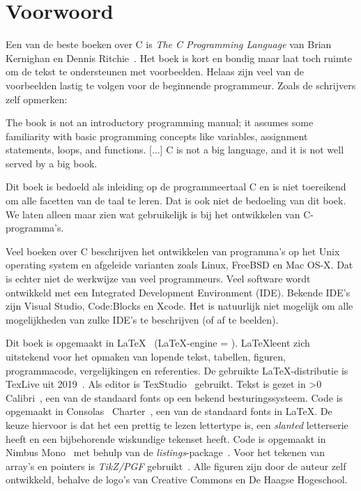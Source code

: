 

\chapter{Voorwoord}
\label{cha:voorwoord}
\thispagestyle{empty}

 Een van de beste boeken over C is
\textsl{The C Programming Language} van Brian Kernighan en Dennis
Ritchie~\cite{kernighan1988c}. Het boek is kort en bondig maar laat toch
ruimte om de tekst te ondersteunen met voorbeelden. Helaas zijn veel van
de voorbeelden lastig te volgen voor de beginnende programmeur. Zoals de
schrijvers zelf opmerken:

\begin{displayquote}
The book is not an introductory programming manual; it assumes some familiarity
with basic programming concepts like variables, assignment statements,
loops, and functions.
[...]
C is not a big language, and it is not well served by a big book.
\end{displayquote}

Dit boek is bedoeld als inleiding op de programmeertaal C en is niet
toereikend om alle facetten van de taal te leren. Dat is ook niet de
bedoeling van dit boek. We laten alleen maar zien wat gebruikelijk is bij
het ontwikkelen van C-programma's. 

Veel boeken over C beschrijven het ontwikkelen van programma's op het Unix
operating system en afgeleide varianten zoals Linux, FreeBSD en Mac OS-X.
Dat is echter niet de werkwijze van veel programmeurs. Veel software wordt
ontwikkeld met een Integrated Development Environment (IDE). Bekende IDE's
zijn Visual Studio, Code:Blocks en Xcode. Het is natuurlijk niet mogelijk
om alle mogelijkheden van zulke IDE's te beschrijven (of af te beelden).

Dit boek is opgemaakt in \LaTeX~\cite{latexwebsite} (\LaTeX-engine = \booktexbanner).
\LaTeX\@ leent zich uitstekend
voor het opmaken van lopende tekst, tabellen, figuren, programmacode, vergelijkingen
en referenties. De gebruikte \LaTeX-distributie is TexLive uit 2019~\cite{texlivewebsite}.
Als editor is TexStudio~\cite{texstudiowebsite} gebruikt. Tekst is gezet in
\fi{}\fi>0
Calibri~\cite{calibrifont}, een van de standaard fonts op een bekend besturingssysteem.
Code is opgemaakt in Consolas~\cite{consolasfont}
\else
Charter~\cite{charterfont}, een van de standaard fonts in \LaTeX.
De keuze hiervoor is dat het een prettig te lezen lettertype is, een
\textsl{slanted} letterserie heeft en een bijbehorende wiskundige tekenset heeft.
Code is opgemaakt in Nimbus Mono~\cite{nimbusfont}
\fi
met behulp van de \textsl{listings}-package~\cite{listingsctan}.
Voor het
tekenen van array's en pointers is \textsl{TikZ/PGF} gebruikt~\cite{tikzctan}.
Alle figuren zijn door de auteur zelf ontwikkeld, behalve de logo's van Creative
Commons en De Haagse Hogeschool.

